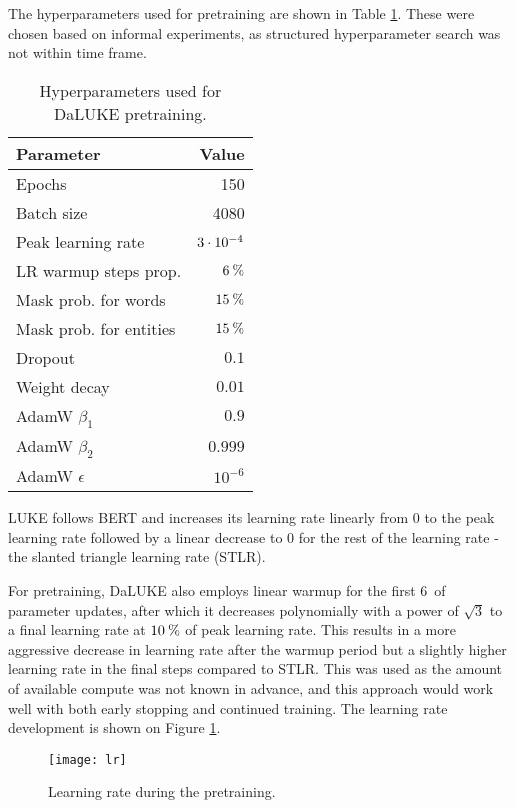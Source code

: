 \documentclass[main.tex]{subfiles}
\begin{document}
The hyperparameters used for pretraining are shown in Table \ref{tab:pretrain-hyper}.
These were chosen based on informal experiments, as structured hyperparameter search was not within time frame.
\begin{table}[H]
    \centering
    \begin{tabular}{l|r}
        Parameter  &    Value\\\hline
        Epochs     & 150\\
        Batch size &    4080\\
        Peak learning rate & $3\cdot10^{-4}$\\
        LR warmup steps prop. & $ 6\:\text{\%{}} $\\
        Mask prob. for words & $ 15\:\text{\%{}} $\\
        Mask prob. for entities & $ 15\:\text{\%{}} $\\
        Dropout & $ 0.1 $\\
        Weight decay & $ 0.01 $\\
        AdamW $ \beta_1 $ & $ 0.9 $\\
        AdamW $ \beta_2 $ & $ 0.999 $\\
        AdamW $ \epsilon $ & $ 10^{-6} $
    \end{tabular}
    \caption{Hyperparameters used for DaLUKE pretraining.}\label{tab:pretrain-hyper}
\end{table}\noindent
LUKE follows BERT and increases its learning rate linearly from 0 to the peak learning rate followed by a linear decrease to 0 for the rest of the learning rate - the slanted triangle learning rate (STLR). \cite{devlin2019bert, yamada2020luke, howardruder2018universal}

For pretraining, DaLUKE also employs linear warmup for the first 6\pro\ of parameter updates, after which it decreases polynomially with a power of $ \sqrt{3} $ to a final learning rate at $10\:\text{\%{}}$ of peak learning rate.
This results in a more aggressive decrease in learning rate after the warmup period but a slightly higher learning rate in the final steps compared to STLR.
This was used as the amount of available compute was not known in advance, and this approach would work well with both early stopping and continued training.
The learning rate development is shown on Figure \ref{fig:lr}.
\begin{figure}
    \centering
    \texttt{[image: lr]}
    \caption{Learning rate during the pretraining.}
    \label{fig:lr}
\end{figure}\noindent
\end{document}
